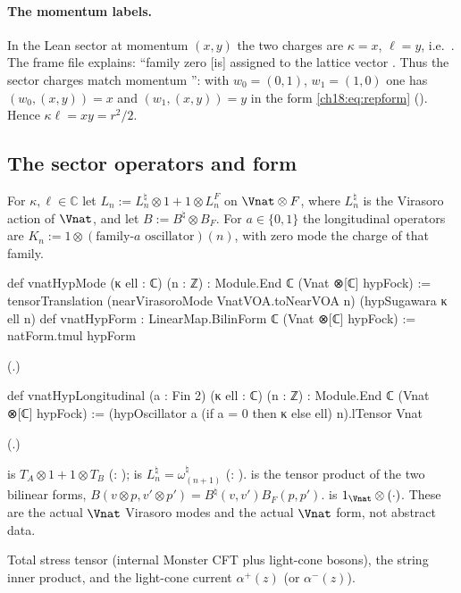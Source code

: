 \paragraph{The momentum labels.}  In the Lean sector at momentum $(x,y)$ the two charges are
$\kappa=x$, $\ell=y$, i.e.\ .  The frame file
 explains: ``family zero [is] assigned to the
lattice vector .  Thus the sector charges  match momentum '':
with $w_0=(0,1)$, $w_1=(1,0)$ one has $(w_0,(x,y))=x$ and $(w_1,(x,y))=y$ in the form
\eqref{ch18:eq:repform} ().  Hence $\kappa\ell=xy=r^2/2$.

\subsection{The sector operators and form}

\begin{definition}\label{ch18:def:sectorops}
For $\kappa,\ell\in\mathbb C$ let $L_n:=L^\natural_n\otimes1+1\otimes L^F_n$ on $\Vnat\otimes F$, where $L^\natural_n$
is the Virasoro action of $\Vnat$, and let $B:=B^\natural\otimes B_F$.  For $a\in\{0,1\}$ the longitudinal operators are
$K_n:=1\otimes(\text{family-}a\text{ oscillator})(n)$, with zero mode the charge of that family.
\end{definition}
\begin{leancode}
def vnatHypMode (κ ell : ℂ) (n : ℤ) : Module.End ℂ (Vnat ⊗[ℂ] hypFock) :=
  tensorTranslation (nearVirasoroMode VnatVOA.toNearVOA n) (hypSugawara κ ell n)
def vnatHypForm : LinearMap.BilinForm ℂ (Vnat ⊗[ℂ] hypFock) := natForm.tmul hypForm
\end{leancode}
(.)
\begin{leancode}
def vnatHypLongitudinal (a : Fin 2) (κ ell : ℂ) (n : ℤ) :
    Module.End ℂ (Vnat ⊗[ℂ] hypFock) :=
  (hypOscillator a (if a = 0 then κ else ell) n).lTensor Vnat
\end{leancode}
(.)
\begin{dictionary}
 is $T_A\otimes1+1\otimes T_B$ (:
);  is
$L^\natural_n=\omega^\natural_{(n+1)}$ (:
).   is the tensor product of
the two bilinear forms, $B(v\otimes p,v'\otimes p')=B^\natural(v,v')B_F(p,p')$.   is
$1_{\Vnat}\otimes(\cdot)$.  These are the actual $\Vnat$ Virasoro modes and the actual $\Vnat$ form, not
abstract data.
\end{dictionary}
\begin{physics}
Total stress tensor (internal Monster CFT plus light-cone bosons), the string
inner product, and the light-cone current $\alpha^+(z)$ (or $\alpha^-(z)$).
\end{physics}

